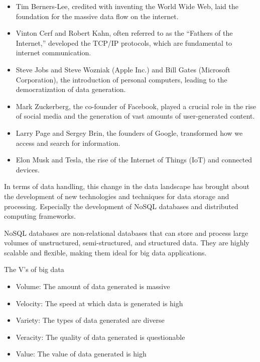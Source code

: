 \begin{itemize}
  \item Tim Berners-Lee, credited with inventing the World Wide Web, laid the foundation
    for the massive data flow on the internet.
  \item Vinton Cerf and Robert Kahn, often referred to as the ``Fathers of the Internet,''
    developed the TCP/IP protocols, which are fundamental to internet communication.
  \item Steve Jobs and Steve Wozniak (Apple Inc.) and Bill Gates (Microsoft Corporation),
    the introduction of personal computers, leading to the democratization of data
    generation.
  \item Mark Zuckerberg, the co-founder of Facebook, played a crucial role in the rise of
    social media and the generation of vast amounts of user-generated content.
  \item Larry Page and Sergey Brin, the founders of Google, transformed how we access and
    search for information.
  \item Elon Musk and Tesla, the rise of the Internet of Things (IoT) and connected
    devices.
\end{itemize}

In terms of data handling, this change in the data landscape has brought about the
development of new technologies and techniques for data storage and processing.  Especially
the development of NoSQL databases and distributed computing frameworks.

NoSQL databases are non-relational databases that can store and process large volumes of
unstructured, semi-structured, and structured data.  They are highly scalable and
flexible, making them ideal for big data applications.

\begin{slidebox}{The V's of big data}{}
  \begin{itemize}
    \item Volume: The amount of data generated is massive
    \item Velocity: The speed at which data is generated is high
    \item Variety: The types of data generated are diverse
    \item Veracity: The quality of data generated is questionable
    \item Value: The value of data generated is high
  \end{itemize}
\end{slidebox}

